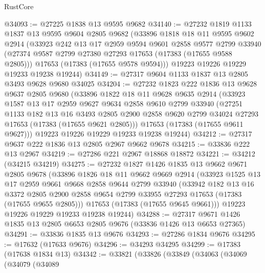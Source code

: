 \begin{lexlean}{RustCore}
\begin{coremodule}
@34093 := @27225 @1838 @13 @9595 @9682
@34140 := @27232
    @1819
    @1133
    @1837
    @13
    @9595
    @9604
    @2805
    @9682
    (@33896
      @1818
      @18
      @11
      @9595
      @9602
      @2914
      (@33923
        @242
        @13
        @17
        @2959
        @9594
        @9601
        @2858
        @9577
        @2799
        @33940
        (@27374 @9587 @2799 @27380 @27293 @17653 (@17383 (@17655 @9588 @2805)))
        @17653
        (@17383 (@17655 @9578 @9594)))
      @19223
      @19226
      @19229
      @19233
      @19238
      @19244)
@34149 := @27317 @9604 @1133 @1837 @13 @2805 @3493 @9628 @9680 @34025
@34204 := @27232
    @1823
    @222
    @1836
    @13
    @9628
    @9637
    @2805
    @9680
    (@33896
      @1822
      @18
      @11
      @9628
      @9635
      @2914
      (@33923
        @1587
        @13
        @17
        @2959
        @9627
        @9634
        @2858
        @9610
        @2799
        @33940
        (@27251
          @1133
          @182
          @13
          @16
          @3493
          @2805
          @2900
          @2858
          @9620
          @2799
          @34024
          @27293
          @17653
          (@17383 (@17655 @9621 @2805)))
        @17653
        (@17383 (@17655 @9611 @9627)))
      @19223
      @19226
      @19229
      @19233
      @19238
      @19244)
@34212 := @27317 @9637 @222 @1836 @13 @2805 @2967 @9662 @9678
@34215 := @33836 @222 @13 @2967
@34219 := @27286 @221 @2967 @18868 @18872
@34221 := @34212 (@34215 @34219)
@34275 := @27232
    @1827
    @1426
    @1835
    @13
    @9662
    @9671
    @2805
    @9678
    (@33896
      @1826
      @18
      @11
      @9662
      @9669
      @2914
      (@33923
        @1525
        @13
        @17
        @2959
        @9661
        @9668
        @2858
        @9644
        @2799
        @33940
        (@33942
          @182
          @13
          @16
          @3372
          @2805
          @2900
          @2858
          @9654
          @2799
          @33955
          @27293
          @17653
          (@17383 (@17655 @9655 @2805)))
        @17653
        (@17383 (@17655 @9645 @9661)))
      @19223
      @19226
      @19229
      @19233
      @19238
      @19244)
@34288 := @27317 @9671 @1426 @1835 @13 @2805 @6653 @2805 @9676 (@33836 @1426 @13 @6653 @27365)
@34291 := @33836 @1835 @13 @9676
@34293 := @27286 @1834 @9676
@34295 := @17632 (@17633 @9676)
@34296 := @34293 @34295
@34299 := @17383 (@17638 @1834 @13)
@34342 := @33821
    (@33826
      (@33849
        (@34063
          (@34069
            (@34079
              (@34089

\end{coremodule}
\end{lexlean}
